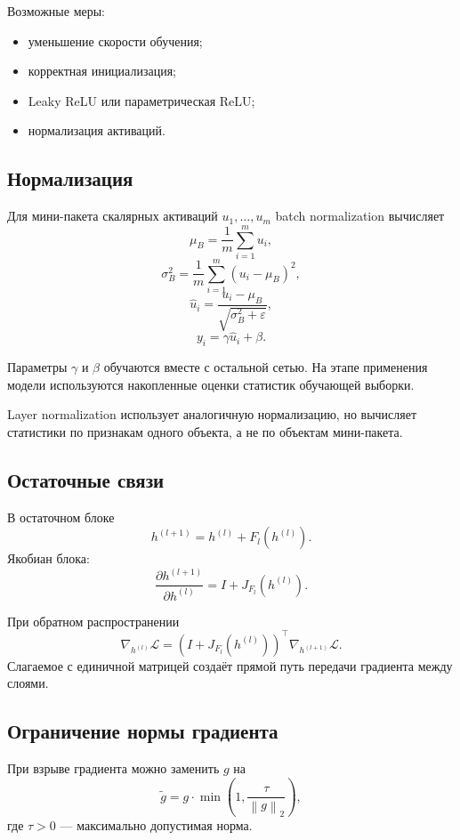 \documentclass[12pt,a4paper]{article}
\theoremstyle{plain}
\theoremstyle{definition}
\theoremstyle{remark}
\newcommand{\norm}[1]{\left\lVert #1 \right\rVert}
\begin{document}
Возможные меры:

\begin{itemize}
    \item уменьшение скорости обучения;
    \item корректная инициализация;
    \item Leaky ReLU или параметрическая ReLU;
    \item нормализация активаций.
\end{itemize}

\subsection{Нормализация}

Для мини-пакета скалярных активаций
$u_1,\ldots,u_m$ batch normalization вычисляет
\[
    \mu_B
    =
    \frac{1}{m}
    \sum_{i=1}^{m}u_i,
\]
\[
    \sigma_B^2
    =
    \frac{1}{m}
    \sum_{i=1}^{m}
    (u_i-\mu_B)^2,
\]
\[
    \widehat{u}_i
    =
    \frac{u_i-\mu_B}
    {\sqrt{\sigma_B^2+\varepsilon}},
\]
\[
    y_i
    =
    \gamma\widehat{u}_i+\beta.
\]

Параметры $\gamma$ и $\beta$ обучаются вместе с остальной сетью.
На этапе применения модели используются накопленные оценки
статистик обучающей выборки.

Layer normalization использует аналогичную нормализацию, но
вычисляет статистики по признакам одного объекта, а не по объектам
мини-пакета.

\subsection{Остаточные связи}

В остаточном блоке
\[
    h^{(l+1)}
    =
    h^{(l)}
    +
    F_l(h^{(l)}).
\]
Якобиан блока:
\[
    \frac{\partial h^{(l+1)}}{\partial h^{(l)}}
    =
    I+J_{F_l}(h^{(l)}).
\]

При обратном распространении
\[
    \nabla_{h^{(l)}}\mathcal{L}
    =
    \left(
        I+J_{F_l}(h^{(l)})
    \right)^\top
    \nabla_{h^{(l+1)}}\mathcal{L}.
\]
Слагаемое с единичной матрицей создаёт прямой путь передачи
градиента между слоями.

\subsection{Ограничение нормы градиента}

При взрыве градиента можно заменить $g$ на
\[
    \widetilde{g}
    =
    g\cdot
    \min
    \left(
        1,
        \frac{\tau}{\norm{g}_2}
    \right),
\]
где $\tau>0$ --- максимально допустимая норма.
\end{document}
